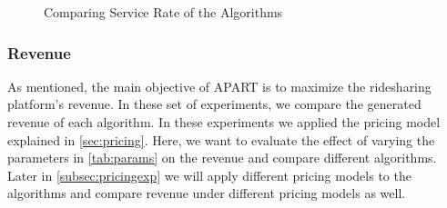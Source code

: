 \begin{figure}[h]
    \centering
    \vspace{-0.15in}
    \caption{Comparing Service Rate of the Algorithms}
    \label{fig:sr}
\end{figure}

\subsubsection{Revenue}
As mentioned, the main objective of APART is to maximize the ridesharing platform's revenue. In these set of experiments, we compare the generated revenue of each algorithm. In these experiments we applied the pricing model explained in \cref{sec:pricing}. Here, we want to evaluate the effect of varying the parameters in \cref{tab:params} on the revenue and compare different algorithms. Later in \cref{subsec:pricingexp} we will apply different pricing models to the algorithms and compare revenue under different pricing models as well.

